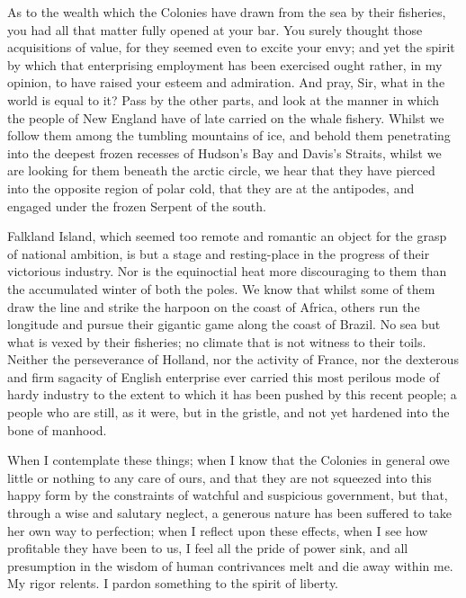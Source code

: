 As to the wealth which the Colonies have drawn from the sea by their fisheries, you had all that matter fully opened at your bar. You surely thought those acquisitions of value, for they seemed even to excite your envy; and yet the spirit by which that enterprising employment has been exercised ought rather, in my opinion, to have raised your esteem and admiration. And pray, Sir, what in the world is equal to it? Pass by the other parts, and look at the manner in which the people of New England have of late carried on the whale fishery. Whilst we follow them among the tumbling mountains of ice, and behold them penetrating into the deepest frozen recesses of Hudson’s Bay and Davis’s Straits, whilst we are looking for them beneath the arctic circle, we hear that they have pierced into the opposite region of polar cold, that they are at the antipodes, and engaged under the frozen Serpent of the south.\par

Falkland Island, which seemed too remote and romantic an object for the grasp of national ambition, is but a stage and resting-place in the progress of their victorious industry. Nor is the equinoctial heat more discouraging to them than the accumulated winter of both the poles. We know that whilst some of them draw the line and strike the harpoon on the coast of Africa, others run the longitude and pursue their gigantic game along the coast of Brazil. No sea but what is vexed by their fisheries; no climate that is not witness to their toils. Neither the perseverance of Holland, nor the activity of France, nor the dexterous and firm sagacity of English enterprise ever carried this most perilous mode of hardy industry to the extent to which it has been pushed by this recent people; a people who are still, as it were, but in the gristle, and not yet hardened into the bone of manhood.\par

When I contemplate these things; when I know that the Colonies in general owe little or nothing to any care of ours, and that they are not squeezed into this happy form by the constraints of watchful and suspicious government, but that, through a wise and salutary neglect, a generous nature has been suffered to take her own way to perfection; when I reflect upon these effects, when I see how profitable they have been to us, I feel all the pride of power sink, and all presumption in the wisdom of human contrivances melt and die away within me. My rigor relents. I pardon something to the spirit of liberty.\par


